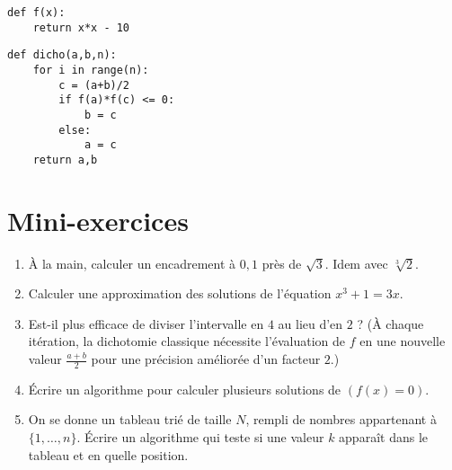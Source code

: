 \begin{frame}[fragile]

\begin{algo}[dichotomie.py (1)]
\begin{lstlisting}
def f(x):
    return x*x - 10 
\end{lstlisting}  
\end{algo}

\begin{algo}[dichotomie.py (2)]
\begin{lstlisting}
def dicho(a,b,n):    
    for i in range(n):
        c = (a+b)/2
        if f(a)*f(c) <= 0:
            b = c
        else:
            a = c
    return a,b
\end{lstlisting}  
\end{algo}

\end{frame}




\section{Mini-exercices}

\begin{frame}

\begin{miniexercice}
\begin{enumerate}
  \item \`A la main, calculer un encadrement à $0,1$ près de $\sqrt{3}$.
  Idem avec $\sqrt[3]{2}$. 
  
  \item Calculer une approximation des solutions de l'équation $x^3+1=3x$.
  
  \item Est-il plus efficace de diviser l'intervalle en $4$ au lieu d'en $2$ ?
  (\`A chaque itération, la dichotomie classique nécessite l'évaluation de $f$ en une nouvelle valeur 
  $\frac{a+b}{2}$ pour une précision améliorée d'un facteur $2$.) 
  
  \item \'Ecrire un algorithme pour calculer plusieurs solutions de $(f(x)=0)$.
  
  \item On se donne un tableau trié de taille $N$, rempli de nombres appartenant à $\{1,\ldots,n\}$.
  \'Ecrire un algorithme qui teste si une valeur $k$ apparaît dans le tableau et en quelle position.

\end{enumerate}
\end{miniexercice}

\end{frame}

